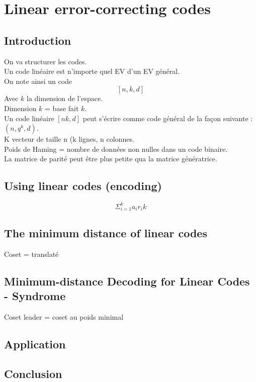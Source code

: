 \section{Linear error-correcting codes}
\subsection{Introduction}
On va structurer les codes.\\
Un code linéaire est n'importe quel EV d'un EV général.\\
On note ainsi un code \[[n, k, d]\]
Avec $k$ la dimension de l'espace.\\
Dimension $k$ = base fait $k$.\\
Un code linéaire $[n k, d]$ peut s'écrire comme code général de la façon suivante : $(n,q^k,d)$.\\
K vecteur de taille n (k lignes, n colonnes.\\
Poids de Haming = nombre de données non nulles dans un code binaire.\\
La matrice de parité peut être plus petite qua la matrice génératrice.
\subsection{Using linear codes (encoding)}
\begin{equation}
 \Sigma^k_{i=1}a_ir_ik
\end{equation}
\subsection{The minimum distance of linear codes}
Coset = translaté
\subsection{Minimum-distance Decoding for Linear Codes - Syndrome}
Coset leader = coset au poids minimal
\subsection{Application}

\subsection{Conclusion}
